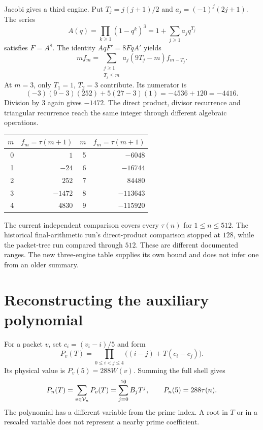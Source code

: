 Jacobi gives a third engine. Put $T_j=j(j+1)/2$ and $a_j=(-1)^j(2j+1)$. The series
\[
 A(q)=\prod_{k\ge1}(1-q^k)^3=1+\sum_{j\ge1}a_jq^{T_j}
\]
satisfies $F=A^8$. The identity $AqF'=8FqA'$ yields
\begin{equation}
 m f_m=\sum_{\substack{j\ge1\\T_j\le m}}
          a_j(9T_j-m)f_{m-T_j}.
 \label{eq:workbook-triangular-recurrence}
\end{equation}
At $m=3$, only $T_1=1$, $T_2=3$ contribute. Its numerator is
\[
 (-3)(9-3)(252)+5(27-3)(1)=-4536+120=-4416.
\]
Division by $3$ again gives $-1472$. The direct product, divisor recurrence and triangular recurrence reach the same integer through different algebraic operations.

\begin{center}
\begin{tabular}{r r r r}
\toprule
$m$ & $f_m=\tau(m+1)$ & $m$ & $f_m=\tau(m+1)$\\
\midrule
0 & $1$ & 5 & $-6048$\\
1 & $-24$ & 6 & $-16744$\\
2 & $252$ & 7 & $84480$\\
3 & $-1472$ & 8 & $-113643$\\
4 & $4830$ & 9 & $-115920$\\
\bottomrule
\end{tabular}
\end{center}

The current independent comparison covers every $\tau(n)$ for $1\le n\le512$. The historical final-arithmetic run's direct-product comparison stopped at $128$, while the packet-tree run compared through $512$. These are different documented ranges. The new three-engine table supplies its own bound and does not infer one from an older summary.

\section{Reconstructing the auxiliary polynomial}
\label{sec:workbook-polynomial}

For a packet $v$, set $c_i=(v_i-i)/5$ and form
\[
 P_v(T)=\prod_{0\le i<j\le4}\bigl((i-j)+T(c_i-c_j)\bigr).
\]
Its physical value is $P_v(5)=288W(v)$. Summing the full shell gives
\[
 P_n(T)=\sum_{v\in\mathcal V_n}P_v(T)=\sum_{j=0}^{10}B_jT^j,
 \qquad P_n(5)=288\tau(n).
\]
The polynomial has a different variable from the prime index. A root in $T$ or in a rescaled variable does not represent a nearby prime coefficient.

